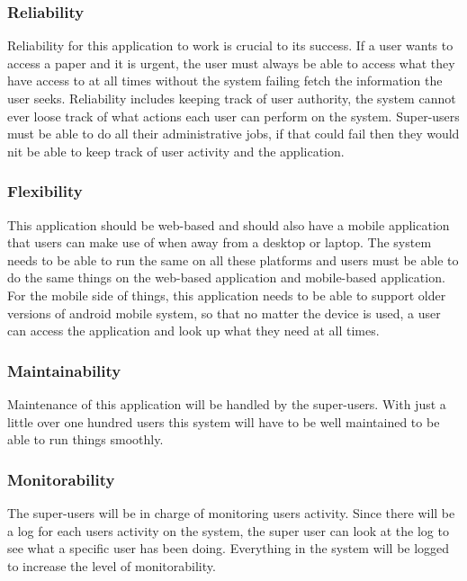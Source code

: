 \documentclass[a4paper,12pt]{report}
\begin{document}
\subsubsection{Reliability}

Reliability for this application to work is crucial to its success. If a user wants to access a paper and it is urgent, the user must always be able to access what they have access to at all times without the system failing fetch the information the user seeks. Reliability includes keeping track of user authority, the system cannot ever loose track of what actions each user can perform on the system. Super-users must be able to do all their administrative jobs, if that could fail then they would nit be able to keep track of user activity and the application. 

\subsubsection{Flexibility}

This application should be web-based and should also have a mobile application that users can make use of when away from a desktop or laptop. The system needs to be able to run the same on all these platforms and users must be able to do the same things on the web-based application and mobile-based application. For the mobile side of things, this application needs to be able to support older versions of android mobile system, so that no matter the device is used, a user can access the application and look up what they need at all times.

\subsubsection{Maintainability}

Maintenance of this application will be handled by the super-users. With just a little over one hundred users this system will have to be well maintained to be able to run things smoothly.

\subsubsection{Monitorability}

The super-users will be in charge of monitoring users activity. Since there will be a log for each users activity on the system, the super user can look at the log to see what a specific user has been doing. Everything in the system will be logged to increase the level of monitorability.
\end{document}
